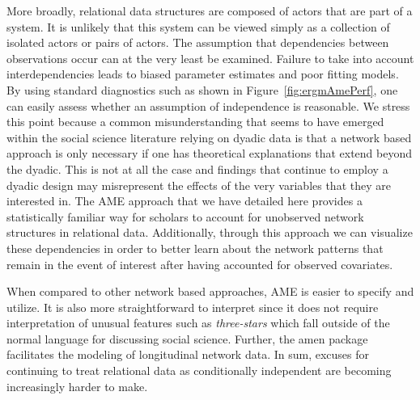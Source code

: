 \documentclass[12pt,twocolumn,twoside]{pnas-new}
\newcommand{\pkg}[1]{{\fontseries{b}\selectfont #1}}
\begin{document}
More broadly, relational data structures are composed of actors that are part of a system. It is unlikely that this system can be viewed simply as a collection of isolated actors or pairs of actors. The assumption  that dependencies between observations occur can at the very least be examined. Failure to take into account interdependencies leads to biased parameter estimates and poor fitting models. By using standard diagnostics such as shown in Figure~\ref{fig:ergmAmePerf}, one can easily assess whether an assumption of independence is reasonable. We stress this point because a common misunderstanding that seems to have emerged within the social science literature relying on dyadic data is that a network based approach is only necessary if one has theoretical explanations that extend beyond the dyadic. This is not at all the case and findings that continue to employ a dyadic design may misrepresent the effects of the very variables that they are interested in. The AME approach that we have detailed here provides a statistically familiar way for scholars to account for unobserved network structures in relational data. Additionally, through this approach we can visualize these dependencies in order to better learn about the network patterns that remain in the event of interest after having accounted for observed covariates.

When compared to other network based approaches, AME is easier to specify and utilize. It is also more straightforward to interpret since it does not require interpretation of unusual features such as \textit{three-stars} which fall outside of the normal language for discussing social science. Further, the \pkg{amen} package facilitates the modeling of longitudinal network data. In sum, excuses for continuing to treat relational data as conditionally independent are becoming increasingly harder to make.


\showacknow %



%
%
\end{document}
